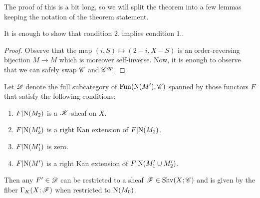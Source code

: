 \documentclass[../../thesis.tex]{subfiles}
\begin{document}
The proof of this is a bit long, so we will split the theorem into a few lemmas keeping the notation of the theorem statement.
\begin{lemma}
    It is enough to show that condition $2.$ implies condition $1.$.
\end{lemma}
\begin{proof}
    Observe that the map $(i,S) \mapsto (2-i, X-S)$ is an order-reversing bijection $M\to M$ which is moreover self-inverse.
    Now, it is enough to observe that we can safely swap $\mathscr{C}$ and $\mathscr{C}^{op}$.
\end{proof}
\begin{lemma}
    Let $\mathscr{D}$ denote the full subcategory of $\mathrm{Fun}(\mathrm{N}(M'), \mathscr{C})$ spanned by those functors $F$ that satisfy the following conditions:
    \begin{enumerate}
        \item $F|\mathrm{N}(M_2)$ is a $\mathscr{K}$-sheaf on $X$.
        \item $F|\mathrm{N}(M'_2)$ is a right Kan extension of $F|\mathrm{N}(M_2)$.
        \item $F|\mathrm{N}(M'_1)$ is zero.
        \item $F|\mathrm{N}(M')$ is a right Kan extension of $F|\mathrm{N}(M'_1 \cup M'_2)$.
    \end{enumerate}
    Then any $F'\in \mathscr{D}$ can be restricted to a sheaf $\mathscr{F} \in \mathrm{Shv}(X;\mathscr{C})$ and is given by the fiber $\Gamma_K(X;\mathscr{F})$ when restricted to $\mathrm{N}(M_0)$.
\end{lemma}
\end{document}
